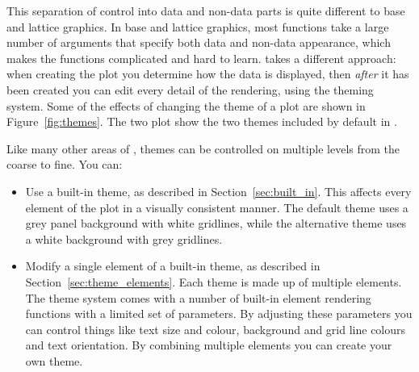 This separation of control into data and non-data parts is quite different to base and lattice graphics.  In base and lattice graphics, most functions take a large number of arguments that specify both data and non-data appearance, which makes the functions complicated and hard to learn.  \ggplot takes a different approach: when creating the plot you determine how the data is displayed, then {\em after} it has been created you can edit every detail of the rendering, using the theming system.  Some of the effects of changing the theme of a plot are shown in Figure~\ref{fig:themes}.  The two plot show the two themes included by default in \ggplot.

% 


Like many other areas of \ggplot, themes can be controlled on multiple levels from the coarse to fine.  You can:

\begin{itemize}
  \item Use a built-in theme, as described in Section~\ref{sec:built_in}.  This affects every element of the plot in a visually consistent manner.  The default theme uses a grey panel background with white gridlines, while the alternative theme uses a white background with grey gridlines.

  \item Modify a single element of a built-in theme, as described in  Section~\ref{sec:theme_elements}. Each theme is made up of multiple elements. The theme system comes with a number of built-in element rendering functions with a limited set of parameters.  By adjusting these parameters you can control things like text size and colour, background and grid line colours and text orientation.  By combining multiple elements you can create your own theme.
  

\end{itemize}


